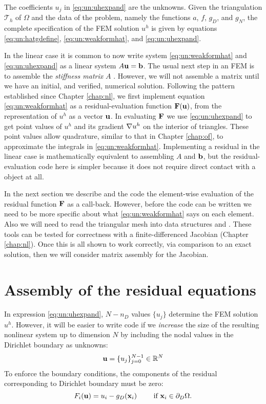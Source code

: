 The coefficients $u_j$ in \eqref{eq:un:uhexpand} are the unknowns.  Given the triangulation $\mathcal{T}_h$ of $\Omega$ and the data of the problem, namely the functions $a$, $f$, $g_D$, and $g_N$, the complete specification of the FEM solution $u^h$ is given by equations \eqref{eq:un:hatgdefine}, \eqref{eq:un:weakformhat}, and \eqref{eq:un:uhexpand}.

In the linear case it is common to now write system \eqref{eq:un:weakformhat} and \eqref{eq:un:uhexpand} as a linear system $A \mathbf{u} = \mathbf{b}$.  The usual next step in an FEM is to assemble the \emph{stiffness matrix} $A$ \citep{Elmanetal2005}.  However, we will not assemble a matrix until we have an initial, and verified, numerical solution.  Following the pattern established since Chapter \ref{chap:nl}, we first implement equation \eqref{eq:un:weakformhat} as a residual-evaluation function $\mathbf{F}(\mathbf{u})$, from the representation of $u^h$ as a vector $\mathbf{u}$.  In evaluating $\mathbf{F}$ we use \eqref{eq:un:uhexpand} to get point values of $u^h$ and its gradient $\nabla u^h$ on the interior of triangles.  These point values allow quadrature, similar to that in Chapter \ref{chap:of}, to approximate the integrals in \eqref{eq:un:weakformhat}.  Implementing a residual in the linear case is mathematically equivalent to assembling $A$ and $\mathbf{b}$, but the residual-evaluation code here is simpler because it does not require direct contact with a \PETSc \pMat object at all.

In the next section we describe and the code the element-wise evaluation of the residual function $\mathbf{F}$ as a \PETSc \pSNES call-back.  However, before the code can be written we need to be more specific about what \eqref{eq:un:weakformhat} says on each element.  Also we will need to read the triangular mesh into \PETSc data structures \pVec and \pIS.  These tools can be tested for correctness with a finite-differenced Jacobian (Chapter \ref{chap:nl}).  Once this is all shown to work correctly, via comparison to an exact solution, then we will consider matrix assembly for the Jacobian.


\section{Assembly of the residual equations}

In expression \eqref{eq:un:uhexpand}, $N-n_D$ values $\{u_j\}$ determine the FEM solution $u^h$.  However, it will be easier to write code if we \emph{increase} the size of the resulting nonlinear system up to dimension $N$ by including the nodal values in the Dirichlet boundary as unknowns:
\begin{equation}
\mathbf{u} = \{u_j\}_{j=0}^{N-1} \in \mathbb{R}^N  \label{eq:un:unknowns}
\end{equation}
To enforce the boundary conditions, the components of the residual corresponding to Dirichlet boundary must be zero:
\begin{equation}
F_i(\mathbf{u}) = u_i - g_D(\mathbf{x}_i) \qquad \text{ if } \mathbf{x}_i \in \partial_D\Omega.  \label{eq:un:dirichletresiduals}
\end{equation}

